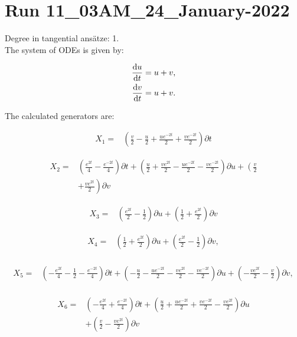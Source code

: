 \section*{Run 11\_03AM\_24\_January-2022}
Degree in tangential ansätze:	1.\\
The system of ODEs is given by:

\begin{align*}
\dv{u}{t}&=u + v,\\
\dv{v}{t}&=u + v.\\
\end{align*}

\noindent The calculated generators are:

\begin{align*}
X_{1}=&\left(\frac{v}{2}- \frac{u}{2}+\frac{u e^{- 2 t}}{2}+\frac{v e^{- 2 t}}{2} \right)\partial t
\end{align*}

\begin{align*}
X_{2}=&\left(\frac{e^{2 t}}{4} - \frac{e^{- 2 t}}{4} \right)\partial t+\left(\frac{u}{2}+\frac{v e^{2 t}}{2}- \frac{u e^{- 2 t}}{2}- \frac{v e^{- 2 t}}{2} \right)\partial u+\left(\frac{v}{2}\right.\\
&+\left.\frac{v e^{2 t}}{2} \right)\partial v
\end{align*}

\begin{align*}
X_{3}=&\left(\frac{e^{2 t}}{2} - \frac{1}{2} \right)\partial u+\left(\frac{1}{2}+\frac{e^{2 t}}{2} \right)\partial v
\end{align*}

\begin{align*}
X_{4}=&\left(\frac{1}{2}+\frac{e^{2 t}}{2} \right)\partial u+\left(\frac{e^{2 t}}{2} - \frac{1}{2} \right)\partial v,\\
\end{align*}

\begin{align*}
X_{5}=&\left(- \frac{e^{2 t}}{4} - \frac{1}{2} - \frac{e^{- 2 t}}{4} \right)\partial t+\left(- \frac{u}{2} - \frac{u e^{- 2 t}}{2} - \frac{v e^{2 t}}{2} - \frac{v e^{- 2 t}}{2} \right)\partial u+\left(- \frac{v e^{2 t}}{2} - \frac{v}{2} \right)\partial v,\\
\end{align*}

\begin{align*}
X_{6}=&\left(- \frac{e^{2 t}}{4}+\frac{e^{- 2 t}}{4} \right)\partial t+\left(\frac{u}{2}+\frac{u e^{- 2 t}}{2}+\frac{v e^{- 2 t}}{2}- \frac{v e^{2 t}}{2} \right)\partial u\\
&+\left(\frac{v}{2}- \frac{v e^{2 t}}{2} \right)\partial v
\end{align*}


